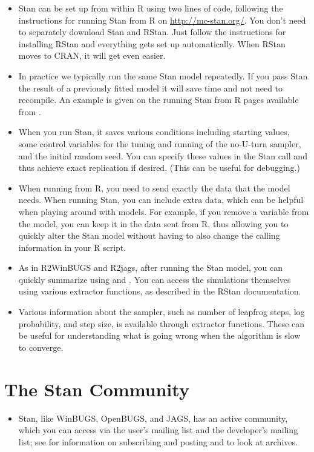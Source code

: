 \begin{itemize}

\item Stan can be set up from within R using two lines of code,
  following the instructions for running Stan from R on
  \url{http://mc-stan.org/}.  You don't need to separately download
  Stan and RStan.  Just follow the instructions for installing RStan
  and everything gets set up automatically.  When RStan moves to
  CRAN, it will get even easier.
\item In practice we typically run the same Stan model repeatedly.  If
  you pass Stan the result of a previously fitted model it will save
  time and not need to recompile.  An example is given on the running
  Stan from R pages available from .
\item When you run Stan, it saves various conditions including
  starting values, some control variables for the tuning and running
  of the no-U-turn sampler, and the initial random seed.  You can
  specify these values in the Stan call and thus achieve exact
  replication if desired.  (This can be useful for debugging.)
\item When running \BUGS from R, you need to send exactly the data
  that the model needs.  When running Stan, you can include extra
  data, which can be helpful when playing around with models.  For
  example, if you remove a variable  from the model, you can keep
  it in the data sent from R, thus allowing you to quickly alter the
  Stan model without having to also change the calling information in
  your R script.
\item As in R2WinBUGS and R2jags, after running the Stan model, you
  can quickly summarize using  and .  You
  can access the simulations themselves using various extractor
  functions, as described in the RStan documentation.  
\item Various information about the sampler, such as number of
  leapfrog steps, log probability, and step size, is available through
  extractor functions.   These can be useful for understanding what is
  going wrong when the algorithm is slow to converge.
\end{itemize}

\section{The Stan Community}

\begin{itemize}
\item Stan, like WinBUGS, OpenBUGS, and JAGS, has an active community,
  which you can access via the user's mailing list and the developer's
  mailing list; see  for information on
  subscribing and posting and to look at archives.
\end{itemize}










